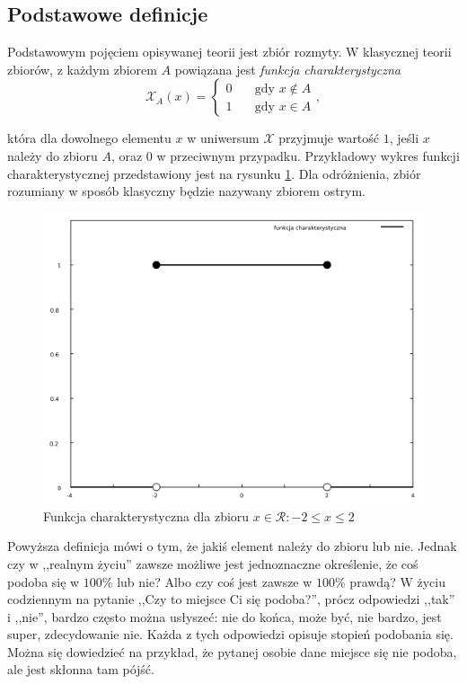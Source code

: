 \subsection{Podstawowe definicje}
Podstawowym pojęciem opisywanej teorii jest zbiór rozmyty. W klasycznej teorii
zbiorów, z każdym zbiorem $A$ powiązana jest \emph{funkcja charakterystyczna}
$$ \mathcal{X}_A(x) = 
  \left\{ 
	\begin{array}{ll}
	  0 & \quad \textrm{gdy } x \notin A \\
      1 & \quad \textrm{gdy } x \in A
  	\end{array} 
  \right., $$
  
która dla dowolnego elementu $x$  w uniwersum $\mathcal{X}$ przyjmuje wartość
$1$, jeśli $x$ należy do zbioru $A$, oraz $0$ w przeciwnym przypadku.
Przykładowy wykres funkcji charakterystycznej przedstawiony jest na rysunku
\ref{fig:funkcja_charakterystyczna}. Dla odróżnienia, zbiór rozumiany w sposób
klasyczny będzie nazywany zbiorem ostrym.

\begin{figure}[ht]
  \includegraphics[width=\linewidth]
  	{chapters/fuzzylogic/funkcja_charakterystyczna}
  \caption{Funkcja charakterystyczna dla zbioru $x \in \mathcal{R} : -2 \leq x
  \leq 2 $}
  \label{fig:funkcja_charakterystyczna}
\end{figure}

Powyższa definicja mówi o tym, że jakiś element należy do zbioru lub nie. Jednak
czy w ,,realnym życiu'' zawsze możliwe jest jednoznaczne określenie, że coś
podoba się w $100\%$ lub nie? Albo czy coś jest zawsze w $100\%$ prawdą? W życiu
codziennym na pytanie ,,Czy to miejsce Ci się podoba?'', prócz odpowiedzi
,,tak'' i ,,nie'', bardzo często można usłyszeć: nie do końca, może być, nie
bardzo, jest super, zdecydowanie nie. Każda z tych odpowiedzi opisuje stopień
podobania się. Można się dowiedzieć na przykład, że pytanej osobie dane miejsce
się nie podoba, ale jest skłonna tam pójść.

